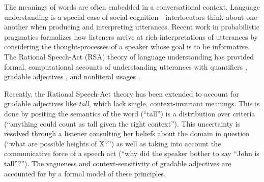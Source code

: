 \documentclass[10pt,letterpaper]{article}
\begin{document}
The meanings of words are often embedded in a conversational context.
Language understanding is a special case of social cognition---interlocutors think about one another when producing and interpreting utterances.  
Recent work in probabilistic pragmatics formalizes how listeners arrive at rich interpretations of utterances by considering the thought-processes of a speaker whose goal is to be informative.
The Rational Speech-Act (RSA) theory of language understanding \cite{Frank2012, Goodman2013} has provided formal, computational accounts of understanding utterances with quantifiers \cite{Goodman2013}, gradable adjectives \cite{Lassiter2015}, and nonliteral usages \cite{Kao2014}.






Recently, the Rational Speech-Act theory has been extended to account for gradable adjectives like \emph{tall}, which lack single, context-invariant meanings. 
This is done by positing the semantics of the word (``tall'') is a distribution over criteria (``anything could count as tall given the right context''). 
This uncertainty is resolved through a listener consulting her beliefs about the domain in question (``what are possible heights of X?'') as well as taking into account the communicative force of a speech act (``why did the speaker bother to say ``John is tall''?'').
The vagueness and context-sensitivity of gradable adjectives are accounted for by a formal model of these principles.
\end{document}
